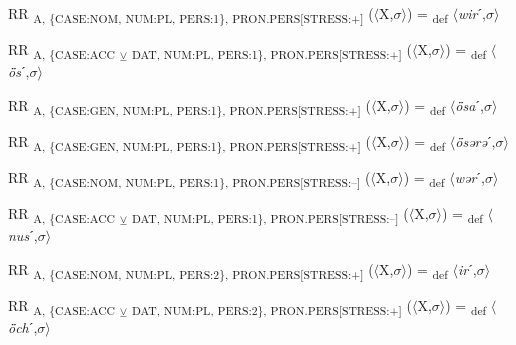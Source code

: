 {\begin{exe}
 RR \textsubscript{A, \{CASE:NOM, NUM:PL, PERS:1\}, PRON.PERS[STRESS:+]} ($\langle$X,$\sigma $$\rangle$) = \textsubscript{def} $\langle$\textit{wir}ˊ,$\sigma $$\rangle$
\end{exe}

\begin{exe}
 RR \textsubscript{A, \{CASE:ACC} \textsubscript{${\veebar}$}\textsubscript{ DAT, NUM:PL, PERS:1\}, PRON.PERS[STRESS:+]} ($\langle$X,$\sigma $$\rangle$) = \textsubscript{def} $\langle$\textit{ȫs}ˊ,$\sigma $$\rangle$
\end{exe}

\begin{exe}
 RR \textsubscript{A, \{CASE:GEN, NUM:PL, PERS:1\}, PRON.PERS[STRESS:+]} ($\langle$X,$\sigma $$\rangle$) = \textsubscript{def} $\langle$\textit{ȫsa}ˊ,$\sigma $$\rangle$
\end{exe}

\begin{exe}
 RR \textsubscript{A, \{CASE:GEN, NUM:PL, PERS:1\}, PRON.PERS[STRESS:+]} ($\langle$X,$\sigma $$\rangle$) = \textsubscript{def} $\langle$\textit{ȫsərə}ˊ,$\sigma $$\rangle$
\end{exe}

\begin{exe}
 RR \textsubscript{A, \{CASE:NOM, NUM:PL, PERS:1\}, PRON.PERS[STRESS:–]} ($\langle$X,$\sigma $$\rangle$) = \textsubscript{def} $\langle$\textit{wər}ˊ,$\sigma $$\rangle$
\end{exe}

\begin{exe}
 RR \textsubscript{A, \{CASE:ACC} \textsubscript{${\veebar}$}\textsubscript{ DAT, NUM:PL, PERS:1\}, PRON.PERS[STRESS:–]} ($\langle$X,$\sigma $$\rangle$) = \textsubscript{def} $\langle$\textit{nus}ˊ,$\sigma $$\rangle$
\end{exe}

\begin{exe}
 RR \textsubscript{A, \{CASE:NOM, NUM:PL, PERS:2\}, PRON.PERS[STRESS:+]} ($\langle$X,$\sigma $$\rangle$) = \textsubscript{def} $\langle$\textit{ir}ˊ,$\sigma $$\rangle$
\end{exe}

\begin{exe}
 RR \textsubscript{A, \{CASE:ACC} \textsubscript{${\veebar}$}\textsubscript{ DAT, NUM:PL, PERS:2\}, PRON.PERS[STRESS:+]} ($\langle$X,$\sigma $$\rangle$) = \textsubscript{def} $\langle$\textit{ȫch}ˊ,$\sigma $$\rangle$
\end{exe}

}
